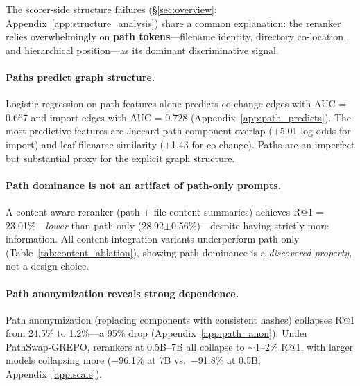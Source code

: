 \documentclass{article}
\begin{document}
The scorer-side structure failures (\S\ref{sec:overview}; Appendix~\ref{app:structure_analysis}) share a common explanation: the reranker relies overwhelmingly on \textbf{path tokens}---filename identity, directory co-location, and hierarchical position---as its dominant discriminative signal.

\paragraph{Paths predict graph structure.}
Logistic regression on path features alone predicts co-change edges with AUC = 0.667 and import edges with AUC = 0.728 (Appendix~\ref{app:path_predicts}).
The most predictive features are Jaccard path-component overlap ($+$5.01 log-odds for import) and leaf filename similarity ($+$1.43 for co-change).
Paths are an imperfect but substantial proxy for the explicit graph structure.

\paragraph{Path dominance is not an artifact of path-only prompts.}
A content-aware reranker (path + file content summaries) achieves R@1 = 23.01\%---\emph{lower} than path-only (28.92$\pm$0.56\%)---despite having strictly more information.
All content-integration variants underperform path-only (Table~\ref{tab:content_ablation}), showing path dominance is a \emph{discovered property}, not a design choice.


\paragraph{Path anonymization reveals strong dependence.}
Path anonymization (replacing components with consistent hashes) collapses R@1 from 24.5\% to 1.2\%---a 95\% drop (Appendix~\ref{app:path_anon}).
Under PathSwap-GREPO, rerankers at 0.5B--7B all collapse to $\sim$1--2\% R@1, with larger models collapsing more ($-$96.1\% at 7B vs.\ $-$91.8\% at 0.5B; Appendix~\ref{app:scale}).
\end{document}

